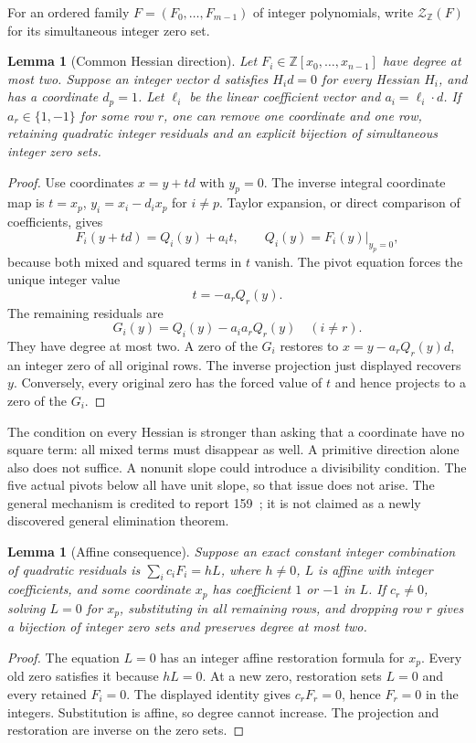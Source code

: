 \documentclass[10pt,letterpaper]{article}
\newtheorem{lemma}[theorem]{Lemma}
\theoremstyle{definition}\newtheorem{definition}[theorem]{Definition}
\newcommand{\Z}{\mathbb Z}\newcommand{\Q}{\mathbb Q}
\newcommand{\Zero}{\mathcal Z}
\begin{document}
For an ordered family $F=(F_0,\ldots,F_{m-1})$ of integer polynomials,
write $\Zero_{\Z}(F)$ for its simultaneous integer zero set.

\begin{lemma}[Common Hessian direction]\label{lem:radical}
Let $F_i\in\Z[x_0,\ldots,x_{n-1}]$ have degree at most two. Suppose an
integer vector $d$ satisfies $H_i d=0$ for every Hessian $H_i$, and has a
coordinate $d_p=1$. Let $\ell_i$ be the linear coefficient vector and
$a_i=\ell_i\cdot d$. If $a_r\in\{1,-1\}$ for some row $r$, one can remove
one coordinate and one row, retaining quadratic integer residuals and an
explicit bijection of simultaneous integer zero sets.
\end{lemma}
\begin{proof}
Use coordinates $x=y+td$ with $y_p=0$. The inverse integral coordinate map
is $t=x_p$, $y_i=x_i-d_i x_p$ for $i\ne p$. Taylor expansion, or direct
comparison of coefficients, gives
\[
F_i(y+td)=Q_i(y)+a_i t,\qquad Q_i(y)=F_i(y)|_{y_p=0},
\]
because both mixed and squared terms in $t$ vanish. The pivot equation
forces the unique integer value
\[
t=-a_r Q_r(y).
\]
The remaining residuals are
\begin{equation}\label{eq:project}
G_i(y)=Q_i(y)-a_i a_r Q_r(y)\quad(i\ne r).
\end{equation}
They have degree at most two. A zero of the $G_i$ restores to
$x=y-a_r Q_r(y)d$, an integer zero of all original rows. The inverse
projection just displayed recovers $y$. Conversely, every original zero
has the forced value of $t$ and hence projects to a zero of the $G_i$.
\end{proof}

The condition on every Hessian is stronger than asking that a coordinate
have no square term: all mixed terms must disappear as well. A primitive
direction alone also does not suffice. A nonunit slope could introduce a
divisibility condition. The five actual pivots below all have unit slope,
so that issue does not arise. The general mechanism is credited to
report 159~\cite{projection159}; it is not claimed as a newly discovered
general elimination theorem.

\begin{lemma}[Affine consequence]\label{lem:affine}
Suppose an exact constant integer combination of quadratic residuals is
$\sum_i c_i F_i=hL$, where $h\ne0$, $L$ is affine with integer
coefficients, and some coordinate $x_p$ has coefficient $1$ or $-1$ in
$L$. If $c_r\ne0$, solving $L=0$ for $x_p$, substituting in all remaining
rows, and dropping row $r$ gives a bijection of integer zero sets and
preserves degree at most two.
\end{lemma}
\begin{proof}
The equation $L=0$ has an integer affine restoration formula for $x_p$.
Every old zero satisfies it because $hL=0$. At a new zero, restoration
sets $L=0$ and every retained $F_i=0$. The displayed identity gives
$c_r F_r=0$, hence $F_r=0$ in the integers. Substitution is affine, so
degree cannot increase. The projection and restoration are inverse on
the zero sets.
\end{proof}
\end{document}

